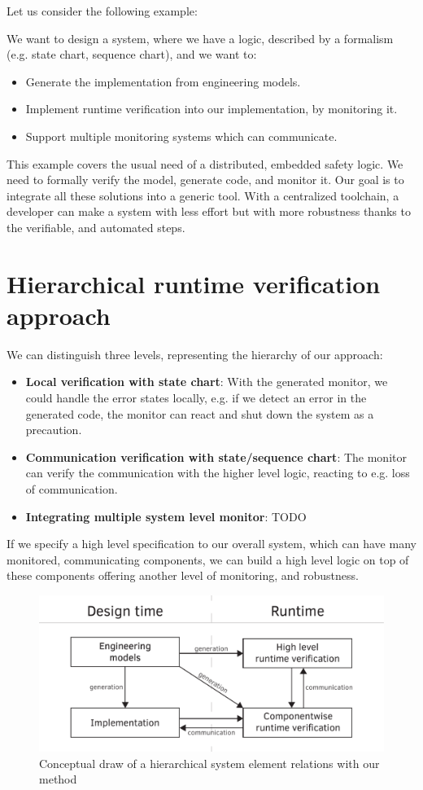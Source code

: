 \noindent Let us consider the following example:

We want to design a system, where we have a logic, described by a formalism (e.g. state chart, sequence chart), and we want to:
\begin{itemize}
	\item Generate the implementation from engineering models.
	\item Implement runtime verification into our implementation, by monitoring it.
	\item Support multiple monitoring systems which can communicate.
\end{itemize}

This example covers the usual need of a distributed, embedded safety logic. We need to formally verify the model, generate code, and monitor it. Our goal is to integrate all these solutions into a generic tool. With a centralized toolchain, a developer can make a system with less effort but with more robustness thanks to the verifiable, and automated steps.
\\[1ex]

\section{Hierarchical runtime verification approach}

We can distinguish three levels, representing the hierarchy of our approach:
\begin{itemize}
	\item \textbf{Local verification with state chart}: With the generated monitor, we could handle the error states locally, e.g. if we detect an error in the generated code, the monitor can react and shut down the system as a precaution.
	\item \textbf{Communication verification with state/sequence chart}: The monitor can verify the communication with the higher level logic, reacting to e.g. loss of communication.
	\item \textbf{Integrating multiple system level monitor}: TODO
\end{itemize}

If we specify a high level specification to our overall system, which can have many monitored, communicating components, we can build a high level logic on top of these components offering another level of monitoring, and robustness.

\begin{figure}[h]
	\centering
	\includegraphics[width=0.8\linewidth]{include/figures/chapter_3/abstract_diagram}
	\caption{Conceptual draw of a hierarchical system element relations with our method}
	\label{fig:overview:abstract_diagram}
\end{figure}

